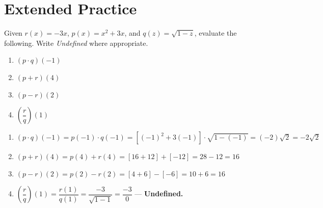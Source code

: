 \documentclass{ximera}
\begin{document}
\bigskip
\section*{Extended Practice}

\begin{problem}
Given $r(x) = -3x$, $p(x) = x^2+3x$, and $q(z) = \sqrt{1-z}$, evaluate the following. Write \textit{Undefined} where appropriate.
\begin{enumerate}
  \item[(a)] $(p\cdot q)(-1)$
  \medskip
  \item[(b)] $(p+r)(4)$
  \medskip
  \item[(c)] $(p-r)(2)$
  \medskip
  \item[(d)] $\left(\dfrac{r}{q}\right)(1)$
\end{enumerate}

\begin{solution}
\begin{enumerate}
  \item[(a)] $(p\cdot q)(-1) = p(-1)\cdot q(-1) = [(-1)^2+3(-1)]\cdot\sqrt{1-(-1)} = (-2)\sqrt{2} = -2\sqrt{2}$

  \item[(b)] $(p+r)(4) = p(4)+r(4) = [16+12]+[-12] = 28-12 = 16$

  \item[(c)] $(p-r)(2) = p(2)-r(2) = [4+6]-[-6] = 10+6 = 16$

  \item[(d)] $\left(\dfrac{r}{q}\right)(1) = \dfrac{r(1)}{q(1)} = \dfrac{-3}{\sqrt{1-1}} = \dfrac{-3}{0}$ --- \textbf{Undefined.}
\end{enumerate}
\end{solution}
\end{problem}
\end{document}
